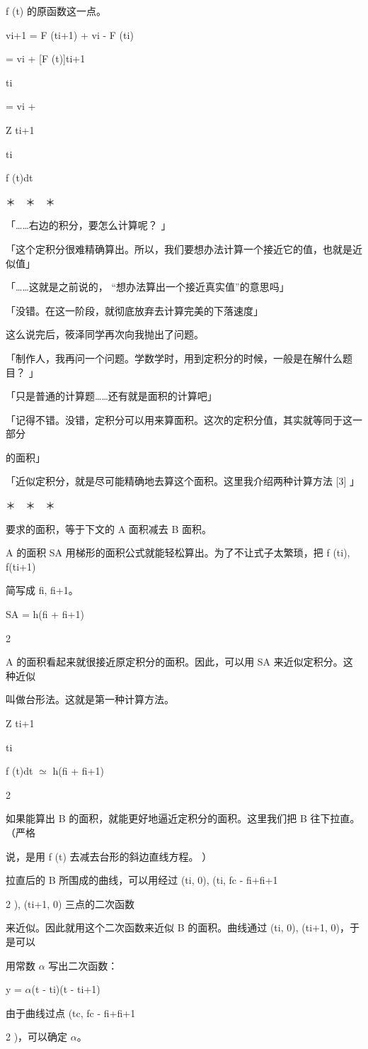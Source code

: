 f (t) 的原函数这一点。\par
vi+1 = F (ti+1) + vi - F (ti)\par
= vi + [F (t)]ti+1\par
ti\par
= vi +\par
Z ti+1\par
ti\par
f (t)dt\par
＊　＊　＊\par
「……右边的积分，要怎么计算呢？ 」\par
「这个定积分很难精确算出。所以，我们要想办法计算一个接近它的值，也就是近似值」\par
「……这就是之前说的， “想办法算出一个接近真实值”的意思吗」\par
「没错。在这一阶段，就彻底放弃去计算完美的下落速度」\par
这么说完后，筱泽同学再次向我抛出了问题。\par
「制作人，我再问一个问题。学数学时，用到定积分的时候，一般是在解什么题目？ 」\par
「只是普通的计算题……还有就是面积的计算吧」\par
「记得不错。没错，定积分可以用来算面积。这次的定积分值，其实就等同于这一部分\par
的面积」\par
「近似定积分，就是尽可能精确地去算这个面积。这里我介绍两种计算方法 [3] 」\par
＊　＊　＊\par
要求的面积，等于下文的 A 面积减去 B 面积。\par

A 的面积 SA 用梯形的面积公式就能轻松算出。为了不让式子太繁琐，把 f (ti), f(ti+1)\par
简写成 fi, fi+1。\par
SA = h(fi + fi+1)\par
2\par
A 的面积看起来就很接近原定积分的面积。因此，可以用 SA 来近似定积分。这种近似\par
叫做台形法。这就是第一种计算方法。\par
Z ti+1\par
ti\par
f (t)dt $\simeq$ h(fi + fi+1)\par
2\par
如果能算出 B 的面积，就能更好地逼近定积分的面积。这里我们把 B 往下拉直。 （严格\par
说，是用 f (t) 去减去台形的斜边直线方程。 ）\par
拉直后的 B 所围成的曲线，可以用经过 (ti, 0), (ti, fc - fi+fi+1\par
2 ), (ti+1, 0) 三点的二次函数\par
来近似。因此就用这个二次函数来近似 B 的面积。曲线通过 (ti, 0), (ti+1, 0)，于是可以\par
用常数 $\alpha$ 写出二次函数：\par
y = $\alpha$(t - ti)(t - ti+1)\par
由于曲线过点 (tc, fc - fi+fi+1\par
2 )，可以确定 $\alpha$。\par

